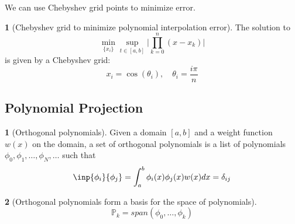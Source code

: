 \documentclass[12pt]{article}
\theoremstyle{definition}
\newtheorem{definition}{\color{NavyBlue}{\textbf{Definition}}}
\newtheorem{theorem}{\color{ForestGreen}{\textbf{Theorem}}}
\theoremstyle{definition}
\begin{document}
We can use Chebyshev grid points to minimize error.
\begin{theorem}[Chebyshev grid to minimize polynomial interpolation error]
	The solution to 
	\begin{equation}
		\min_{\{x_i\}} \sup_{t \in [a,b]} \bigg\lvert \prod_{k=0}^n (x-x_k) \bigg\rvert
	\end{equation}
	is given by a Chebyshev grid:
	\begin{equation}
		x_i = \cos (\theta_i), \quad \theta_i = \frac{i\pi}{n}
	\end{equation}
\end{theorem}
\subsection{Polynomial Projection}

\begin{definition}[Orthogonal polynomials]
	Given a domain $[a,b]$ and a weight function $w(x)$ on the domain, a set of orthogonal polynomials is a list of polynomials $\phi_0, \phi_1, \ldots, \phi_N, \ldots$ such that
	\begin{equation}
		\inp{\phi_i}{\phi_j} = \int_a^b \phi_i(x)\phi_j(x)w(x)dx = \delta_{ij}
	\end{equation}
\end{definition}

\begin{theorem}[Orthogonal polynomials form a basis for the space of polynomials]
	\begin{equation}
		\mathbb{P}_k = span(\phi_0,\ldots,\phi_k)
	\end{equation}
\end{theorem}
\end{document}
